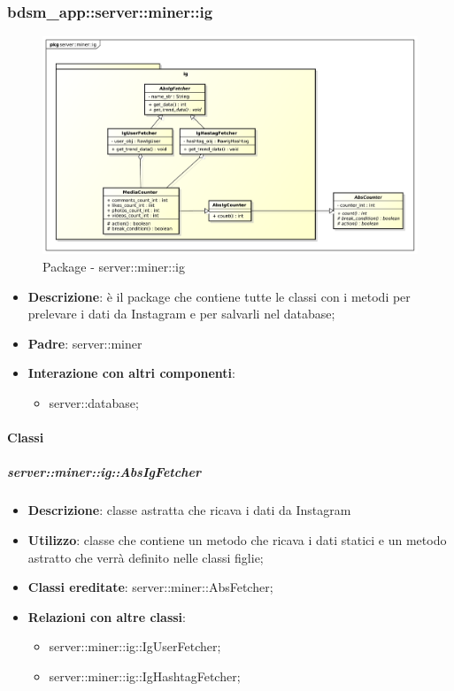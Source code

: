 \subsubsection{bdsm\_app::server::miner::ig} %
\label{ssub:bdsm_app_server_miner_ig}
\begin{figure}[htbp]
	\centering
	\centerline{\includegraphics[scale=0.4]{./images/server/miner_ig.pdf}}
	\caption{Package - server::miner::ig}
\end{figure}


\begin{itemize}
  \item \textbf{Descrizione}: è il package che contiene tutte le classi con i metodi per prelevare i dati da Instagram e per salvarli nel database;
  \item \textbf{Padre}: server::miner
   \item \textbf{Interazione con altri componenti}:
  	\begin{itemize}
  		\item server::database;
  	\end{itemize}
\end{itemize}

	\paragraph{Classi} %
	\subparagraph{server::miner::ig::AbsIgFetcher} %
		\label{subp:server_miner_ig_AbsIgFetcher}
			\begin{itemize}
				\item \textbf{Descrizione}: classe astratta che ricava i dati da Instagram
				\item \textbf{Utilizzo}: classe che contiene un metodo che ricava i dati statici e un metodo astratto che verrà definito nelle classi figlie;
				\item \textbf{Classi ereditate}: server::miner::AbsFetcher;
				\item \textbf{Relazioni con altre classi}:
					\begin{itemize}
						\item server::miner::ig::IgUserFetcher;
						\item server::miner::ig::IgHashtagFetcher;
					\end{itemize}
			\end{itemize}

